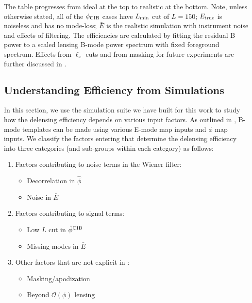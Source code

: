 \begin{table}
{The table progresses from ideal at the top to realistic at the bottom.
Note, unless otherwise stated, all of the $\phi_{\rm CIB}$ cases have $L_{\rm min}$ cut of $L=150$;
$E_{\rm true}$ is noiseless and has no mode-loss;
$\bar{E}$ is the realistic simulation with instrument noise and effects of filtering.
The efficiencies are calculated by fitting the residual B power to a scaled lensing B-mode power spectrum with fixed foreground spectrum.
Effects from $\ell_x$ cuts and from masking for future experiments are further discussed in .
\vspace{0.3cm}
}
\label{tab:eff_ebarpcib}
\end{table}

\subsection{Understanding Efficiency from Simulations}
\label{sec:effsim}
In this section, we use the simulation suite we have built for this work to study how the delensing efficiency depends on various input factors.
As outlined in , B-mode templates can be made using various E-mode map inputs and $\phi$ map inputs.
We classify the factors entering  that determine the delensing efficiency into three categories (and sub-groups within each category) as follows:
\begin{enumerate}[leftmargin=0.5cm]
  \item{Factors contributing to noise terms in the Wiener filter:}
    \begin{itemize}[leftmargin=0.5cm]
      \item{Decorrelation in $\hat{\phi}$}
      \item{Noise in $\bar{E}$}
    \end{itemize}
   \item{Factors contributing to signal terms:}
      \begin{itemize}[leftmargin=0.5cm]
     	 \item{Low $L$ cut in $\hat{\phi}^{\rm CIB}$}
     	 \item{Missing modes in $\bar{E}$}
      \end{itemize}
  \item{Other factors that are not explicit in :}
    \begin{itemize}[leftmargin=0.5cm]
   	 \item{Masking/apodization}
   	 \item{Beyond $\mathcal{O}(\phi)$ lensing}
    \end{itemize}

\end{enumerate}

